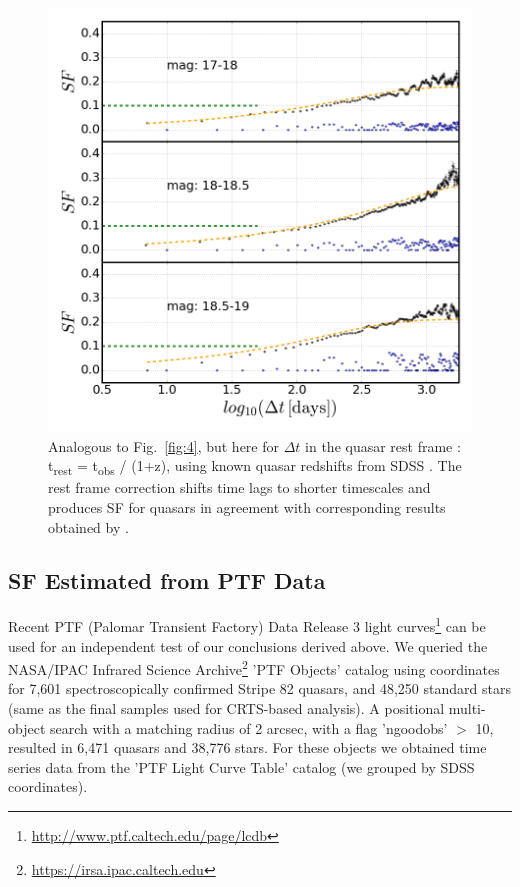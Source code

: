 \documentclass[fleqn,usenatbib]{mnras}
\begin{document}
\begin{figure}

\vskip -0.15in
\includegraphics[width=1.1\columnwidth, center]{Fig_5_SF_QSO_starsB_r_cut_rest.png}
\caption{Analogous to Fig.~\ref{fig:4}, but here for $\Delta t$ in the quasar rest frame : t\textsubscript{rest} = t\textsubscript{obs} / (1+z), using known quasar redshifts from SDSS \citep{macleod2010}.  The rest frame correction shifts time lags to shorter timescales and produces
SF for quasars in agreement with corresponding results obtained by \citep{macleod2010}.}
\label{fig:5}
\end{figure}


\subsection{SF Estimated from PTF Data}

Recent PTF (Palomar Transient Factory) Data Release 3 light curves\footnote{\url{http://www.ptf.caltech.edu/page/lcdb}}
can be used for an independent test of our conclusions derived above. We queried the NASA/IPAC Infrared Science 
Archive\footnote{\url{https://irsa.ipac.caltech.edu}} 'PTF Objects' catalog using coordinates for 7,601 spectroscopically
confirmed Stripe 82 quasars, and 48,250 standard stars (same as the final samples used for CRTS-based analysis).
A positional multi-object search with a matching radius of 2 arcsec, with a flag 'ngoodobs' $>$ 10,  resulted in  
6,471 quasars and 38,776 stars.  For these objects we obtained time series data from the 'PTF Light Curve Table' catalog
(we grouped by SDSS coordinates). 
\end{document}
